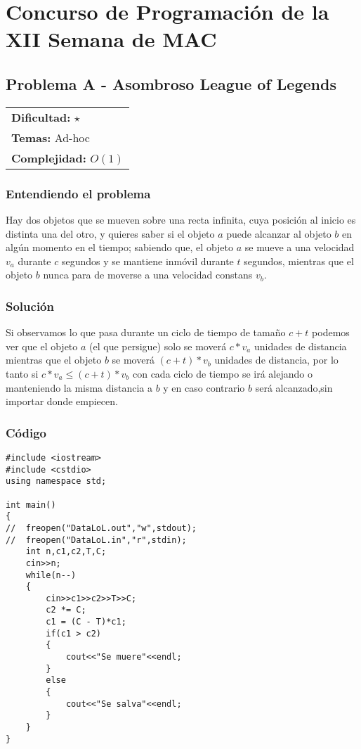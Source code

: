 \chapter{Concurso de Programación de la XII Semana de MAC}

\section{Problema A - Asombroso League of Legends}

\hfill
\begin{tabular}{@{}l@{}}
\textbf{Dificultad:} $\star$ \\
\textbf{Temas:} Ad-hoc \\
\textbf{Complejidad:} $O(1)$
\end{tabular}

\subsection*{Entendiendo el problema}
Hay dos objetos que se mueven sobre una recta infinita,
cuya posición al inicio es distinta una del otro, y quieres saber si el objeto $a$ puede alcanzar al objeto $b$ en algún momento en el tiempo; sabiendo que, el objeto $a$ se mueve a una velocidad $v_a$ durante $c$ segundos y se mantiene inmóvil durante $t$ segundos,  mientras que el objeto $b$ nunca para de moverse a una velocidad constans $v_b$.
\subsection*{Solución}
Si observamos lo que pasa durante un ciclo de tiempo de tamaño $c+t$ podemos ver que el objeto $a$ (el que persigue) solo se moverá $c * v_a$ unidades de distancia mientras que el objeto $b$ se moverá $(c+t)*v_b$ unidades de distancia, por lo tanto si $c*v_a \leq (c+t)*v_b$ con cada ciclo de tiempo se irá alejando  o manteniendo la misma distancia a $b$ y en caso contrario $b$ será alcanzado,sin importar donde empiecen.
\subsection*{Código}

\begin{verbatim}
#include <iostream>
#include <cstdio>
using namespace std;

int main()
{
//	freopen("DataLoL.out","w",stdout);
//	freopen("DataLoL.in","r",stdin);
	int n,c1,c2,T,C;
	cin>>n;
	while(n--)
	{
		cin>>c1>>c2>>T>>C;
		c2 *= C;
		c1 = (C - T)*c1;
		if(c1 > c2)
		{
			cout<<"Se muere"<<endl;
		}
		else
		{
			cout<<"Se salva"<<endl;
		}
	}
}

\end{verbatim}

